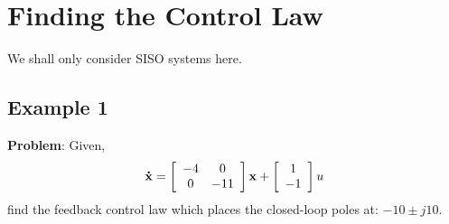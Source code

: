 \section*{Finding the Control Law} %
\label{sec:finding_the_control_law}

We shall only consider SISO systems here.


\ifslidesonly
\begin{slide}
   
\end{slide}
\fi


\ifslidesonly
\begin{slide}
   
\end{slide}
\fi

 

\ifslidesonly
\begin{slide}
   
\end{slide}
\fi


\ifslidesonly
\begin{slide}
   
\end{slide}
\fi



\subsection*{Example 1} %
\label{sub:example_1}

\textbf{Problem}: Given,
\[
{\bf{\dot x}} = \left[ {\begin{array}{*{20}c}
   { - 4} & 0  \\
   0 & { - 11}  \\
\end{array}} \right]{\bf{x}} + \left[ {\begin{array}{*{20}c}
   1  \\
   { - 1}  \\
\end{array}} \right]u
\]
find the feedback control law which places the closed-loop poles at: $-10\pm j10$.

